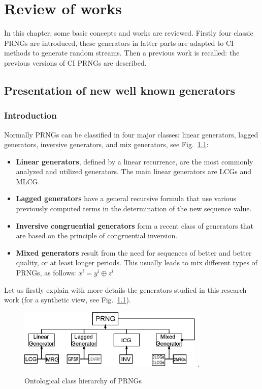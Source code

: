\chapter{Review of works}
\label{Review of works}
\minitoc

In this chapter, some basic concepts and works are reviewed. Firstly four classic PRNGs are introduced, these generators in latter parts are adapted to CI methods to generate random streams. Then a previous work is recalled: the previous versions of CI PRNGs \cite{bibtexwangqianxue} are described.

\section{Presentation of new well known generators}
\label{The generation of pseudo-random sequence}

\subsection{Introduction}

Normally PRNGs can be classified in four major classes: linear generators, lagged generators, inversive generators, and mix generators, see Fig.~\ref{Ontological class hierarchy of RNGs}:
\begin{itemize}
 \item \textbf{Linear generators}, defined by a linear recurrence, are the most commonly analyzed and utilized generators. The main linear generators are LCGs and MLCG.
 \item \textbf{Lagged generators} have a general recursive formula that use various previously computed terms in the determination of the new sequence value.
 \item \textbf{Inversive congruential generators} form a recent class of generators that are based on the principle of congruential inversion.
 \item \textbf{Mixed generators} result from the need for sequences of better and better quality, or at least longer periods. This usually leads to mix different types of PRNGs, as follows: $x^i=y^i\oplus z^i$
\end{itemize}

Let us firstly explain with more details the generators studied in this research work (for a synthetic view, see Fig.~\ref{Ontological class hierarchy of RNGs}).

\begin{figure}
\centering
\includegraphics[width=3.5in]{TYPEPRNG.eps}
\DeclareGraphicsExtensions.
\caption{Ontological class hierarchy of PRNGs}
\label{Ontological class hierarchy of RNGs}
\end{figure}
\label{The generation of pseudorandom sequence}

